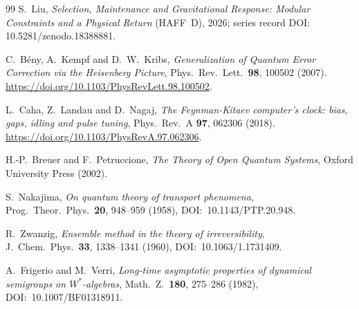 \documentclass[12pt]{article}
\theoremstyle{definition}
\theoremstyle{remark}
\begin{document}
\begin{thebibliography}{99}
S.~Liu, \emph{Selection, Maintenance and Gravitational Response: Modular Constraints and a Physical Return} (HAFF~D), 2026;
series record DOI: 10.5281/zenodo.18388881.

C.~B\'eny, A.~Kempf and D.~W.~Kribs,
\emph{Generalization of Quantum Error Correction via the Heisenberg Picture},
Phys.\ Rev.\ Lett.\ \textbf{98}, 100502 (2007).
\url{https://doi.org/10.1103/PhysRevLett.98.100502}.

L.~Caha, Z.~Landau and D.~Nagaj,
\emph{The Feynman-Kitaev computer's clock: bias, gaps, idling and pulse tuning},
Phys.\ Rev.\ A \textbf{97}, 062306 (2018).
\url{https://doi.org/10.1103/PhysRevA.97.062306}.

H.-P.~Breuer and F.~Petruccione,
\emph{The Theory of Open Quantum Systems},
Oxford University Press (2002).

S.~Nakajima,
\emph{On quantum theory of transport phenomena},
Prog.\ Theor.\ Phys.\ \textbf{20}, 948--959 (1958),
DOI:~10.1143/PTP.20.948.

R.~Zwanzig,
\emph{Ensemble method in the theory of irreversibility},
J.\ Chem.\ Phys.\ \textbf{33}, 1338--1341 (1960),
DOI:~10.1063/1.1731409.

A.~Frigerio and M.~Verri,
\emph{Long-time asymptotic properties of dynamical semigroups on \(W^*\)-algebras},
Math.\ Z.\ \textbf{180}, 275--286 (1982),
DOI:~10.1007/BF01318911.

\end{thebibliography}
 
\end{document}

